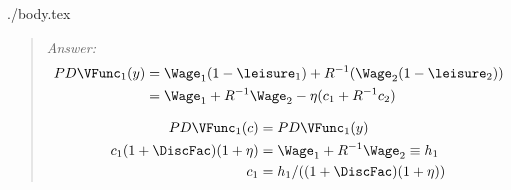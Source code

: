 \documentclass{handout}
\begin{document}
\begin{verbatimwrite}{./body.tex}
{{\begin{quote}{\it Answer:}{}
  \begin{equation}\begin{gathered}\begin{aligned}
    \label{eq:17}
    PD\VFunc_{1}(y) & =  \Wage_{1}(1-\leisure_{1}) + R^{-1}(\Wage_{2}(1-\leisure_{2}))
\\ & =  \Wage_{1}+R^{-1}\Wage_{2}-\eta (c_{1}+R^{-1} c_{2})
  \end{aligned}\end{gathered}\end{equation}

  \begin{equation}\begin{gathered}\begin{aligned}
    \label{eq:19}
    PD\VFunc_{1}(c) & =  PD\VFunc_{1}(y)
\\ c_{1}(1+\DiscFac)(1+\eta) & =  \Wage_{1}+R^{-1}\Wage_{2} \equiv h_{1}
\\ c_{1} & =  h_{1}/((1+\DiscFac)(1+\eta))
  \end{aligned}\end{gathered}\end{equation}
\end{quote}
}{}


\medskip\medskip\medskip}{}



\end{verbatimwrite}
\end{document}
